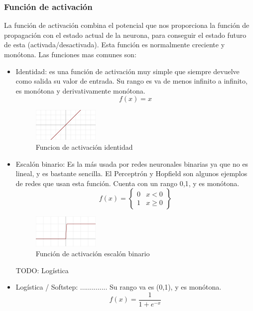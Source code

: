 \subsubsection {Función de activación}
La función de activación combina el potencial que nos proporciona la función de propagación con el estado actual de la neurona, para conseguir el estado futuro de esta (activada/desactivada). Esta función es normalmente creciente y monótona. Las funciones mas comunes son:
\begin{itemize}
\item Identidad: es una función de activación muy simple que siempre devuelve como salida su valor de entrada. Su rango es va de menos infinito a infinito, es monótona y derivativamente monótona.
\begin{equation}
f(x) = x
\end{equation}
\begin{figure}[htp]
\centering
\includegraphics[scale=1]{images/Activation_identity.png}
\caption{Funcion de activación identidad}
\end{figure}
\item Escalón binario: Es la más usada por redes neuronales binarias ya que no es lineal, y es bastante sencilla. El Perceptrón y Hopfield son algunos ejemplos de redes que usan esta función. Cuenta con un rango {0,1}, y es monótona.
\begin{equation}
f(x) = \begin{Bmatrix}
0 & x<0\\
1 & x\geq 0
\end{Bmatrix}
\end{equation}
\begin{figure}[htp]
\centering
\includegraphics[scale=1]{images/Activation_binary_step.png}
\caption{Función de activación escalón binario}
\end{figure}
TODO: Logística
\item Logística / Softstep: .............. Su rango va es (0,1), y es monótona.
\begin{equation}
f(x) = \frac{1}{1+e^{-x}}
\end{equation}

\end{itemize}
